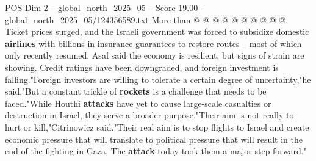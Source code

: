 \begin{textsample}{POS Dim 2 – global\_north\_2025\_05 – Score 19.00 – global\_north\_2025\_05/124356589.txt}
More than @ @ @ @ @ @ @ @ @ @.
Ticket prices surged, and the Israeli government was forced to subsidize domestic \textbf{airlines} with billions in insurance guarantees to restore routes -- most of which only recently resumed.
Asaf said the economy is resilient, but signs of strain are showing.
Credit ratings have been downgraded, and foreign investment is falling."Foreign investors are willing to tolerate a certain degree of uncertainty,"he said."But a constant trickle of \textbf{rockets} is a challenge that needs to be faced."While Houthi \textbf{attacks} have yet to cause large-scale casualties or destruction in Israel, they serve a broader purpose."Their aim is not really to hurt or kill,"Citrinowicz said."Their real aim is to stop flights to Israel and create economic pressure that will translate to political pressure that will result in the end of the fighting in Gaza.
The \textbf{attack} today took them a major step forward."

\end{textsample}
